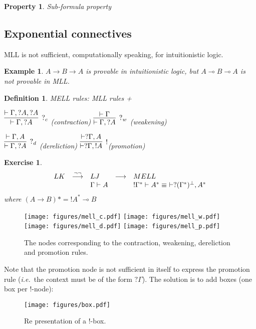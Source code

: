 \documentclass[a4paper,10pt]{article}
\newcommand{\ie}{\textit{i.e.}\ }
\newtheorem{definition}{Definition}
\newtheorem{prop}{Property}
\newtheorem{ex}{Example}
\newtheorem{exo}{Exercise}
\begin{document}
	\begin{prop}{Sub-formula property}
	\end{prop}	
	
	\subsection{Exponential connectives}
	
	MLL is not sufficient, computationally speaking, for intuitionistic logic.
	
	\begin{ex}
		$A \rightarrow B \rightarrow A$ is provable in intuitionistic logic, but $A \multimap B \multimap A$ is not provable in MLL.
	\end{ex}	
	
	\begin{definition}{MELL rules:} MLL rules +
	
	$\infer[?_c]{\vdash \Gamma, ?A}{\vdash \Gamma, ?A, ?A}$ (contraction) 
	$\infer[?_w]{\vdash \Gamma, ?A}{\vdash \Gamma}$ (weakening)
	
	$\infer[?_d]{\vdash \Gamma, ?A}{\vdash \Gamma, A}$ (dereliction)
	$\infer[!]{\vdash ?\Gamma, !A}{\vdash ?\Gamma, A}$(promotion)
	\end{definition}
	
	\begin{exo}
		$$\begin{array}{l l l l l}
			LK & \overset{\lnot\lnot}{\longrightarrow} &  LJ & \longrightarrow & MELL \\
			& & \Gamma \vdash A & & !\Gamma ^* \vdash A^* \equiv\ \vdash ?(\Gamma ^ *)^\perp, A^*
		\end{array}$$
		where $(A \rightarrow B)* = ! A^* \multimap B$		
	\end{exo}	

	\begin{figure}[h]
	\begin{center}
		\texttt{[image: figures/mell\_c.pdf]} \quad
		\texttt{[image: figures/mell\_w.pdf]} \quad
		\texttt{[image: figures/mell\_d.pdf]}	\quad
		\texttt{[image: figures/mell\_p.pdf]}	\quad
		\caption{The nodes corresponding to the contraction, weakening, dereliction and promotion rules.}
	\end{center}	
	\end{figure}	
	
	Note that the promotion node is not sufficient in itself to express the promotion rule (\ie the context must be of the form $?\Gamma$).
	The solution is to add boxes (one box per $!$-node):
	\begin{figure}[h]
	\begin{center}
		\texttt{[image: figures/box.pdf]}
		\caption{Re presentation of a $!$-box.}
	\end{center}	
	\end{figure}
	
\end{document}
